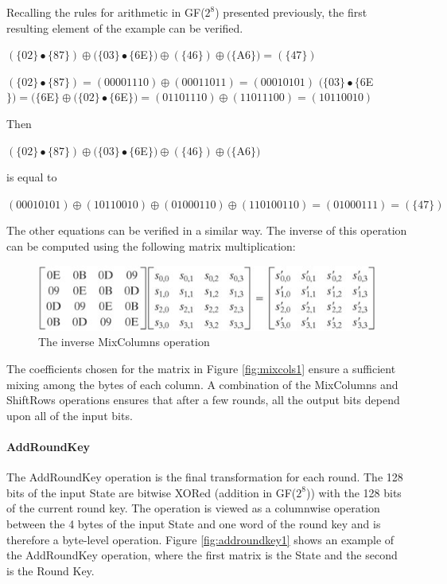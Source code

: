 \documentclass[a4paper,10pt]{report}
\begin{document}
Recalling the rules for arithmetic in GF($2^{8}$) presented previously, the first resulting element of the example can be verified. 

\begin{center}

$ (\{02\}\bullet \{87\}) \oplus (\{03\} \bullet \{6$E$\}) \oplus (\{46\}) \oplus (\{$A$6\}) = (\{47\}) $
\end{center}
\begin{center}
$ (\{02\}\bullet \{87\}) = (00001110) \oplus (00011011) = (00010101) $
$ (\{03\} \bullet \{6$E$\}) = (\{6$E$\} \oplus (\{02\} \bullet \{6$E$\}) = (01101110) \oplus (11011100) = (10110010) $
\end{center}

Then 

\begin{center}
 $ (\{02\}\bullet \{87\}) \oplus (\{03\} \bullet \{6$E$\}) \oplus (\{46\}) \oplus (\{$A$6\}) $
\end{center}

is equal to

\begin{center}
 $ (00010101) \oplus (10110010) \oplus (01000110) \oplus (110100110) = (01000111) = (\{47\})$
\end{center}

The other equations can be verified in a similar way. The inverse of this operation can be computed using the following matrix multiplication:

\begin{figure}[htb]
\centering
\includegraphics[scale=0.7]{images/invmixcols.jpg}
\caption{The inverse MixColumns operation}
\label{fig:invmixcols}
\end{figure}

The coefficients chosen for the matrix in Figure \ref{fig:mixcols1} ensure a sufficient mixing among the bytes of each column. A combination of the MixColumns and ShiftRows operations ensures that after a few rounds, all the output bits depend upon all of the input bits. 

\paragraph{AddRoundKey}
The AddRoundKey operation is the final transformation for each round. The 128 bits of the input State are bitwise XORed (addition in GF($2^{8}$)) with the 128 bits of the current round key. The operation is viewed as a columnwise operation between the 4 bytes of the input State and one word of the round key and is therefore a byte-level operation. Figure \ref{fig:addroundkey1} shows an example of the AddRoundKey operation, where the first matrix is the State and the second is the Round Key. 
\end{document}
